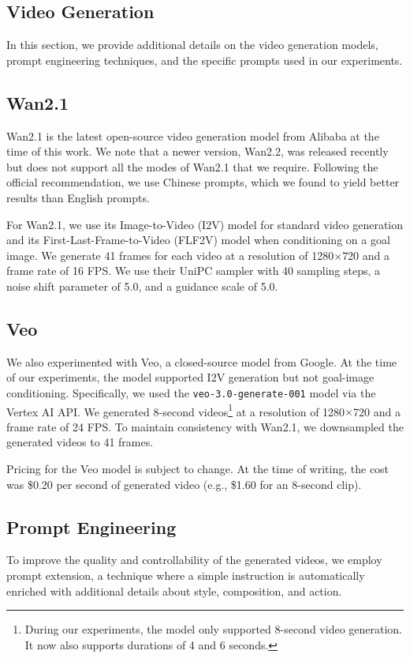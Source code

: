 \begin{appendices}

\section{Video Generation}
\label{sec:appendix_video_generation}

In this section, we provide additional details on the video generation models, prompt engineering techniques, and the specific prompts used in our experiments.

\subsection{Wan2.1}
Wan2.1 is the latest open-source video generation model from Alibaba at the time of this work.
We note that a newer version, Wan2.2, was released recently but does not support all the modes of Wan2.1 that we require.
Following the official recommendation, we use Chinese prompts, which we found to yield better results than English prompts.

For Wan2.1, we use its Image-to-Video (I2V) model for standard video generation and its First-Last-Frame-to-Video (FLF2V) model when conditioning on a goal image.
We generate 41 frames for each video at a resolution of 1280$\times$720 and a frame rate of 16 FPS. We use their UniPC sampler with 40 sampling steps, a noise shift parameter of 5.0, and a guidance scale of 5.0.

\subsection{Veo}
We also experimented with Veo, a closed-source model from Google. At the time of our experiments, the model supported I2V generation but not goal-image conditioning.
Specifically, we used the \texttt{veo-3.0-generate-001} model via the Vertex AI API.
We generated 8-second videos\footnote{During our experiments, the model only supported 8-second video generation. It now also supports durations of 4 and 6 seconds.} at a resolution of 1280$\times$720 and a frame rate of 24 FPS.
To maintain consistency with Wan2.1, we downsampled the generated videos to 41 frames.

Pricing for the Veo model is subject to change.
At the time of writing, the cost was \$0.20 per second of generated video (e.g., \$1.60 for an 8-second clip).

\subsection{Prompt Engineering}
To improve the quality and controllability of the generated videos, we employ prompt extension, a technique where a simple instruction is automatically enriched with additional details about style, composition, and action.


\end{appendices}
